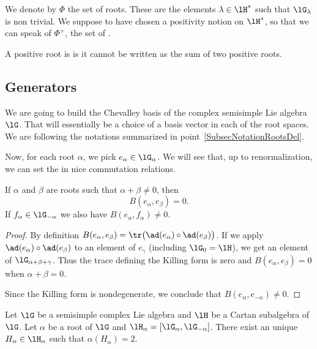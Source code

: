 We denote by \( \Phi\) the set of roots. These are the elements \( \lambda\in\lH^*\) such that \( \lG_{\lambda}\) is non trivial. We suppose to have chosen a positivity notion on \( \lH^*\), so that we can speak of \( \Phi^+\), the set of .

A positive root is  is it cannot be written as the sum of two positive roots.

\subsection{Generators}

We are going to build the Chevalley basis of the complex semisimple Lie algebra \( \lG\). That will essentially be a choice of a basis vector in each of the root spaces. We are following the notations summarized in point~\ref{SubsecNotationRootsDel}.


Now, for each root $\alpha$, we pick $e_{\alpha}\in\lG_{\alpha}$. We will see that, up to renormalization, we can set the in nice commutation relations.

\begin{lemma}       \label{LemBalpahbetaef}
	If \( \alpha\) and \( \beta\) are roots such that \( \alpha+\beta\neq 0\), then
	\begin{equation}
		B(e_{\alpha},e_{\beta})=0.
	\end{equation}
	If \( f_{\alpha}\in\lG_{-\alpha}\) we also have \( B(e_{\alpha},f_{\alpha})\neq 0\).
\end{lemma}

\begin{proof}
	By definition \( B(e_{\alpha},e_{\beta})=\tr\big( \ad(e_{\alpha})\circ\ad(e_{\beta}) \big)\). If we apply \( \ad(e_{\alpha})\circ\ad(e_{\beta})\) to an element of \( e_{\gamma}\) (including \( \lG_0=\lH\)), we get an element of \( \lG_{\alpha+\beta+\gamma}\). Thus the trace defining the Killing form is zero and \( B(e_{\alpha},e_{\beta})=0\) when \( \alpha+\beta=0\).

	Since the Killing form is nondegenerate, we conclude that \( B(e_{\alpha},e_{-\alpha})\neq 0 \).
\end{proof}

\begin{corollary}       \label{CorrExistInverseRoot}
	Let \( \lG\) be a semisimple complex Lie algebra and \( \lH\) be a Cartan subalgebra of \( \lG\). Let \( \alpha\) be a root of \( \lG\) and \( \lH_{\alpha}=[\lG_{\alpha},\lG_{-\alpha}]\). There exist an unique \( H_{\alpha}\in\lH_{\alpha}\) such that \( \alpha(H_{\alpha})=2\).
\end{corollary}

